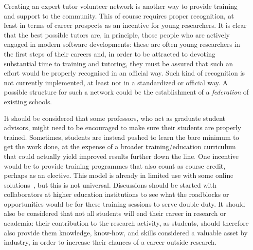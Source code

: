 \documentclass[12pt,a4paper]{article}
\begin{document}
Creating an expert tutor volunteer network is another way to provide training
and support to the community.
This of course requires proper recognition, at least in terms of career
prospects as an incentive for young researchers. It is clear that the best
possible tutors are, in principle, those people who are actively engaged in
modern software developments: these are often young researchers in the
first steps of their careers and, in order to be attracted to devoting
substantial time to training and tutoring, they must be assured that such an
effort would be properly recognised in an official way. Such kind of recognition
is not currently implemented, at least not in a standardized or official way. A
possible structure for such a network could be the establishment of a 
{\em federation} of existing schools.

It should be considered that some professors, who act as graduate student
advisors, might need to be encouraged to make sure their students are properly
trained. Sometimes, students are instead pushed to learn the bare minimum to get
the work done, at the expense of a broader training/education curriculum that
could actually yield improved results further down the line. One incentive
would be to provide training programmes that also count as course credit, perhaps
as an elective. This model is already in limited use with some online
solutions~\cite{TrainingProgram}, but this is not universal.
Discussions should be started with collaborators at higher education
institutions to see what the roadblocks or opportunities would be for these
training sessions to serve double duty.
It should also be considered that not all students will end their career in
research or academia: their contribution to the research activity, as students,
should therefore also provide them knowledge, know-how, and skills considered a
valuable asset by industry, in order to increase their chances of a career
outside research.
\end{document}
